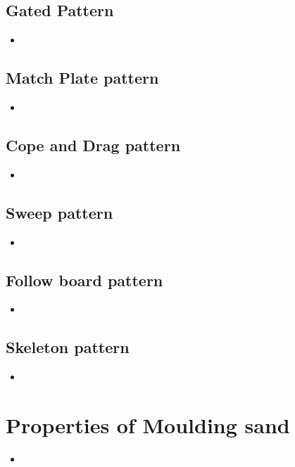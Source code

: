 \documentclass[8pt]{report}
\begin{document}
	\subsection{Gated Pattern}
		\begin{itemize}
			\item
		\end{itemize}
	\subsection{Match Plate pattern}
		\begin{itemize}
			\item 
		\end{itemize}
	\subsection{Cope and Drag pattern}
		\begin{itemize}
			\item
		\end{itemize}
	\subsection{Sweep pattern}
		\begin{itemize}
			\item 
		\end{itemize}
	\subsection{Follow board pattern}
		\begin{itemize}
			\item 
		\end{itemize}
	\subsection{Skeleton pattern}
		\begin{itemize}
			\item 
		\end{itemize}\hrulefill
\section{Properties of Moulding sand}
	\begin{itemize}
		\item
	\end{itemize}\hrulefill
\end{document}
